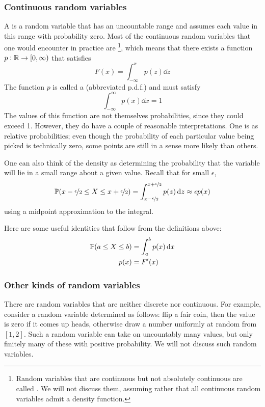 \documentclass{article}
\begin{document}
\subsubsection{Continuous random variables}
A  is a random variable that has an uncountable range and assumes each value in this range with probability zero.
Most of the continuous random variables that one would encounter in practice are \footnote{
    Random variables that are continuous but not absolutely continuous are called .
    We will not discuss them, assuming rather that all continuous random variables admit a density function.
}, which means that there exists a function $p : \mathbb{R} \to [0,\infty)$ that satisfies
\[F(x) = \int_{-\infty}^x p(z)\dd{z}\]
The function $p$ is called a  (abbreviated p.d.f.) and must satisfy
\[\int_{-\infty}^\infty p(x)\dd{x} = 1\]
The values of this function are not themselves probabilities, since they could exceed 1.
However, they do have a couple of reasonable interpretations.
One is as relative probabilities; even though the probability of each particular value being picked is technically zero, some points are still in a sense more likely than others.

One can also think of the density as determining the probability that the variable will lie in a small range about a given value.
Recall that for small $\epsilon$,
\[\mathbb{P}(x-\nicefrac{\epsilon}{2} \leq X \leq x+\nicefrac{\epsilon}{2}) = \int_{x-\nicefrac{\epsilon}{2}}^{x+\nicefrac{\epsilon}{2}} p(z)\dd{z} \approx \epsilon p(x)\]
using a midpoint approximation to the integral.

Here are some useful identities that follow from the definitions above:
\begin{align*}
\mathbb{P}(a \leq X \leq b) &= \int_a^b p(x)\dd{x} \\
p(x) &= F'(x)
\end{align*}

\subsubsection{Other kinds of random variables}
There are random variables that are neither discrete nor continuous.
For example, consider a random variable determined as follows:
flip a fair coin, then the value is zero if it comes up heads, otherwise draw a number uniformly at random from $[1,2]$.
Such a random variable can take on uncountably many values, but only finitely many of these with positive probability.
We will not discuss such random variables.



\nocite{*}
\end{document}
